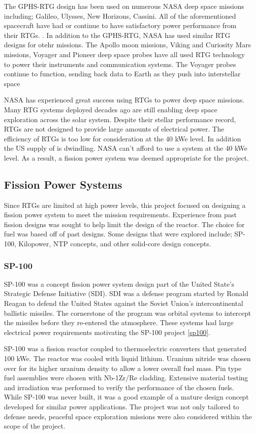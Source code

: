 The GPHS-RTG design has been used on
numerous NASA deep space missions including; Galileo, Ulysses, New Horizons,
Cassini. All of the aforementioned spacecraft have had or continue to have
satisfactory power performance from their RTGs. \citep{bennett_mission_2006}.
In addition to the GPHS-RTG, NASA has used similar RTG designs for otehr
missions. The Apollo moon missions, Viking and Curiosity Mars missions, Voyager
and Pioneer deep space probes have all used RTG technology to power their
instruments and communication systems. The Voyager probes continue to function,
sending back data to Earth as they push into interstellar space
\citep{mmrtg_fact}  

NASA has experienced great success using RTGs to power deep space missions. Many
RTG systems deployed decades ago are still enabling deep space exploration
across the solar system. Despite their stellar performance record, RTGs are not
designed to provide large amounts of electrical power. The efficiency of RTGs is
too low for consideration at the 40 kWe level. In addition the US supply of \pu
is dwindling. NASA can't afford to use a \pu system at the 40 kWe level. As a
result, a fission power system was deemed appropriate for the project.

\subsection{Fission Power Systems}
Since RTGs are limited at high power levels, this project focused on designing a
fission power system to meet the mission requirements. Experience from past
fission designs was sought to help limit the design of the reactor. The choice
for fuel was based off of past designs. Some designs that were explored include;
SP-100, Kilopower, NTP concepts, and other solid-core design concepts.
    \subsubsection{SP-100}
    SP-100 was a concept fission power system design part of the United State's
    Strategic Defense Initiative (SDI). SDI was a defense program started by
    Ronald Reagan to defend the United States against the Soviet Union's intercontinental
    ballistic missiles. The cornerstone of the program was orbital systems to
    intercept the missiles before they re-entered the atmosphere. These systems
    had large electrical power requirements motivating the SP-100 project
    \ref{sp100}.

    SP-100 was a fission reactor coupled to thermoelectric converters that
    generated 100 kWe. The reactor was cooled with liquid lithium. Uranium
    nitride was chosen over \uox for its higher uranium density to allow a lower
    overall fuel mass. Pin type fuel assemblies were chosen with Nb-1Zr/Re
    cladding. Extensive material testing and irradiation was performed to
    verify the performance of the chosen fuels. While SP-100 was never built, it
    was a good example of a mature design concept developed for similar power
    applications. The project was not only tailored to defense needs, peaceful
    space exploration missions were also considered within the scope of the
    project.

